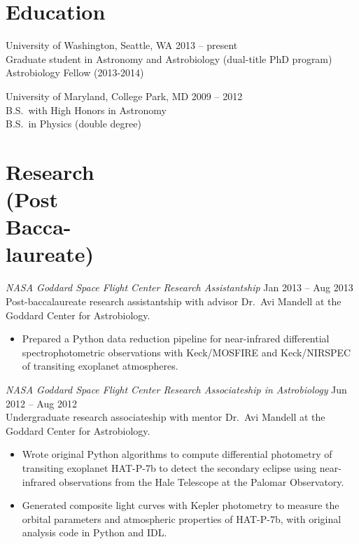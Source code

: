 \documentclass[margin]{res}
\begin{document}
\begin{resume}

\section{Education} 
University of Washington, Seattle, WA \hfill 2013 -- present\\
Graduate student in Astronomy and Astrobiology (dual-title PhD program)\\
Astrobiology Fellow (2013-2014)

University of Maryland, College Park, MD  \hfill 2009 -- 2012\\
B.S.\ with High Honors in Astronomy \\
B.S.\ in Physics (double degree)\\
 
\section{Research \\(Post \\Bacca-\\laureate)} 

{\sl NASA Goddard Space Flight Center Research Assistantship} \hfill           Jan 2013 -- Aug 2013\\
Post-baccalaureate research assistantship with advisor Dr.\ Avi Mandell at the Goddard Center for Astrobiology.
\begin{itemize}%
\item Prepared a Python data reduction pipeline for near-infrared differential spectrophotometric observations with Keck/MOSFIRE and Keck/NIRSPEC of transiting exoplanet atmospheres.
\end{itemize}  

{\sl NASA Goddard Space Flight Center Research Associateship in Astrobiology} \hfill            Jun 2012 -- Aug 2012 \\
Undergraduate research associateship with mentor Dr.\ Avi Mandell at the Goddard Center for Astrobiology.
\begin{itemize}%
\item Wrote original Python algorithms to compute differential photometry of transiting exoplanet HAT-P-7b to detect the secondary eclipse using near-infrared observations from the Hale Telescope at the Palomar Observatory. 

\item Generated composite light curves with Kepler photometry to measure the orbital parameters and atmospheric properties of HAT-P-7b, with original analysis code in Python and IDL. 


\end{itemize}
\end{resume}
\end{document}

